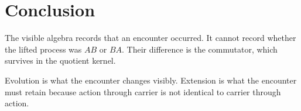 \section{Conclusion}

The visible algebra records that an encounter occurred. It cannot
record whether the lifted process was \(AB\) or \(BA\). Their difference is
the commutator, which survives in the quotient kernel.

Evolution is what the encounter changes visibly. Extension is what
the encounter must retain because action through carrier is not
identical to carrier through action.
